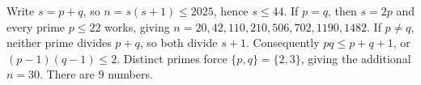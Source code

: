 Write $s=p+q$, so $n=s(s+1)\le2025$, hence $s\le44$. If $p=q$, then $s=2p$ and every prime $p\le22$ works, giving $n=20,42,110,210,506,702,1190,1482$. If $p\ne q$, neither prime divides $p+q$, so both divide $s+1$. Consequently $pq\le p+q+1$, or $(p-1)(q-1)\le2$. Distinct primes force $\{p,q\}=\{2,3\}$, giving the additional $n=30$. There are $\boxed{9}$ numbers.
